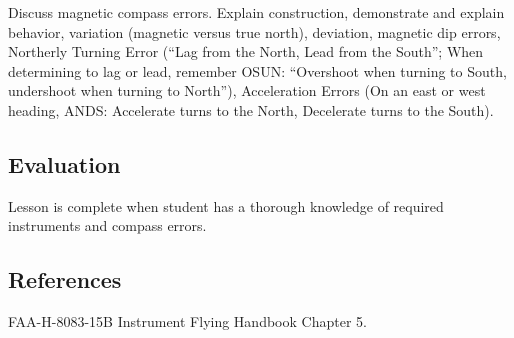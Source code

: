 Discuss magnetic compass errors. Explain construction, demonstrate and explain
behavior, variation (magnetic versus true north), deviation, magnetic dip
errors, Northerly Turning Error (``Lag from the North, Lead from the South'';
When determining to lag or lead, remember OSUN: ``Overshoot when turning to
South, undershoot when turning to North''), Acceleration Errors (On an east or
west heading, ANDS: Accelerate turns to the North, Decelerate turns to the
South).

\subsection{Evaluation}

Lesson is complete when student has a thorough knowledge of required
instruments and compass errors.

\subsection{References}

FAA-H-8083-15B Instrument Flying Handbook Chapter 5.

